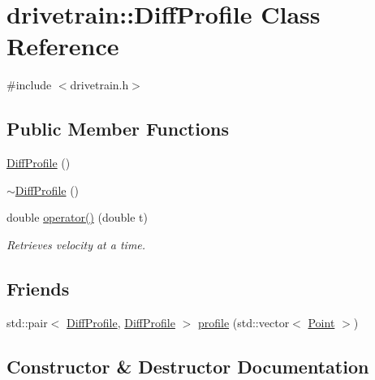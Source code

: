 \hypertarget{classdrivetrain_1_1DiffProfile}{}\section{drivetrain\+:\+:Diff\+Profile Class Reference}
\label{classdrivetrain_1_1DiffProfile}


{\ttfamily \#include $<$drivetrain.\+h$>$}

\subsection*{Public Member Functions}
\begin{DoxyCompactItemize}
\item 
\hyperlink{classdrivetrain_1_1DiffProfile_ab288f4be495aba93ba27fe91d4dde56c}{Diff\+Profile} ()
\item 
\hyperlink{classdrivetrain_1_1DiffProfile_a8a18259f122866ffc7969440aba3bc0d}{$\sim$\+Diff\+Profile} ()
\item 
double \hyperlink{classdrivetrain_1_1DiffProfile_a25bf2fb3d75dfbffa0d27e66b73e9b18}{operator()} (double t)
\begin{DoxyCompactList}\small\item\em Retrieves velocity at a time. \end{DoxyCompactList}\end{DoxyCompactItemize}
\subsection*{Friends}
\begin{DoxyCompactItemize}
\item 
std\+::pair$<$ \hyperlink{classdrivetrain_1_1DiffProfile}{Diff\+Profile}, \hyperlink{classdrivetrain_1_1DiffProfile}{Diff\+Profile} $>$ \hyperlink{classdrivetrain_1_1DiffProfile_a5d5ddf929f6a13ffbc8386f9082191c8}{profile} (std\+::vector$<$ \hyperlink{structdrivetrain_1_1Point}{Point} $>$)
\end{DoxyCompactItemize}


\subsection{Constructor \& Destructor Documentation}
